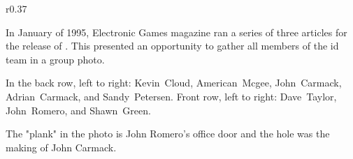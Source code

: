 \par
{
\setlength{\abovecaptionskip}{15pt}
}
\par





\begin{wrapfigure}[12]{r}{0.37\textwidth}
\end{wrapfigure}
\vspace{9pt}
In January of 1995, Electronic Games magazine ran a series of three articles for the release of \doomii{}. This presented an opportunity to gather all members of the id team in a group photo.\par
 \vspace{10pt}
 In the back row, left to right: Kevin~Cloud, American~Mcgee, John~Carmack, Adrian~Carmack, and Sandy~Petersen. Front row, left to right: Dave~Taylor, John~Romero, and Shawn~Green.\par
 \vspace{10pt}
 \par The "plank" in the photo is John Romero's office door and the hole was the making of John Carmack.\par
 \vspace{16pt}






